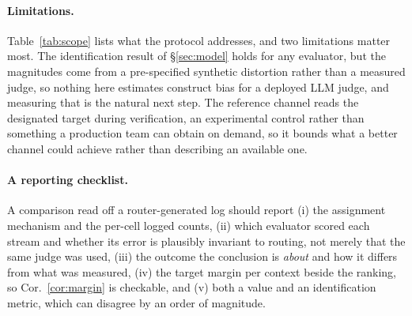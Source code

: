\documentclass{article}
\theoremstyle{plain}
\theoremstyle{remark}
\begin{document}
\paragraph{Limitations.} Table~\ref{tab:scope} lists what the protocol addresses, and two limitations matter most. The
identification result of \S\ref{sec:model} holds for any evaluator, but the magnitudes come from a
pre-specified synthetic distortion rather than a measured judge, so nothing here estimates construct
bias for a deployed LLM judge, and measuring that is the natural next step. The reference channel
reads the designated target during verification, an experimental control rather than something a
production team can obtain on demand, so it bounds what a better channel could achieve rather than
describing an available one.

\paragraph{A reporting checklist.} A comparison read off a router-generated log should report (i)
the assignment mechanism and the per-cell logged counts, (ii) which evaluator scored each stream and whether its error is plausibly invariant to
routing, not merely that the same judge was used, (iii) the outcome the conclusion is \emph{about}
and how it differs from what was measured, (iv) the target margin per context beside the ranking, so
Cor.~\ref{cor:margin} is checkable, and (v) both a value and an identification metric, which can
disagree by an order of magnitude.

\label{endofmaintext}



\appendix
\newpage
\end{document}
